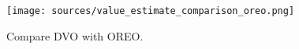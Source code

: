 \begin{figure}[!htbp]
    \centering\small
    \setlength{\abovecaptionskip}{6pt}  
    \texttt{[image: sources/value\_estimate\_comparison\_oreo.png]}
    \caption{Compare DVO with OREO.}
    \label{fig:value_estimate_comparison_oreo}
\end{figure}
